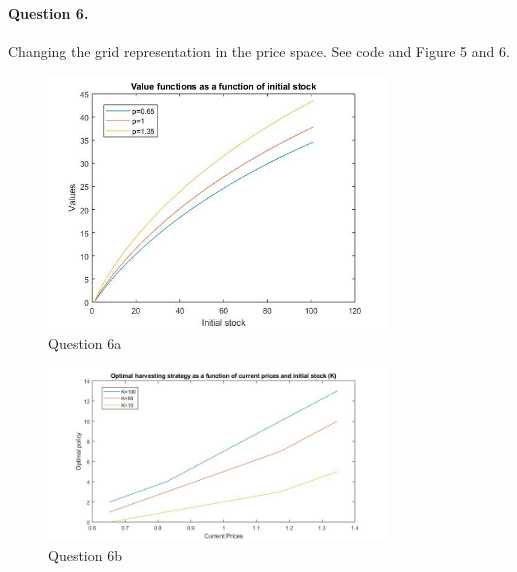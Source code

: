 \documentclass[11pt]{article}
\begin{document}
\paragraph{Question 6.} Changing the grid representation in the price space. See code and Figure 5 and 6.


\begin{figure}[!h]
	\centering
	\includegraphics[width=0.8\textwidth]{Figures/figure3.jpg}
	\caption{Question 6a}
\end{figure}

\begin{figure}[!h]
	\centering
	\includegraphics[width=0.8\textwidth]{Figures/figure4.jpg}
	\caption{Question 6b}
\end{figure}
\end{document}
